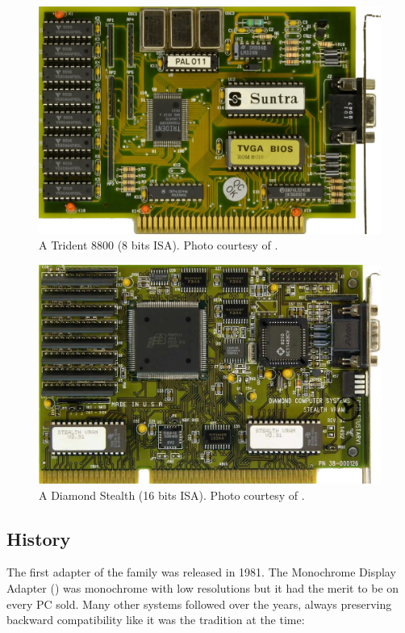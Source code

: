 \documentclass[book.tex]{subfiles}
\begin{document}
\begin{figure}[H] 
  \centering \includegraphics[width=\textwidth]{imgs/hardware/suntra_trident_tvga8800br.png} 
  \caption{A Trident 8800  (8 bits ISA). Photo courtesy of .}
\end{figure}
\par
\begin{figure}[H] 
  \centering 
  \includegraphics[width=\textwidth]{imgs/hardware/diamond_stealth_vram_revb2.png} 
  \caption{A Diamond Stealth (16 bits ISA). Photo courtesy of .}
\end{figure}

  \subsection{History}

The first adapter of the family was released in 1981. The Monochrome Display
   Adapter () was monochrome with low resolutions but it had the merit to be on every PC sold. Many other systems followed over the years, always preserving backward compatibility like it was the tradition at the time:
\bigskip
  
\end{document}
